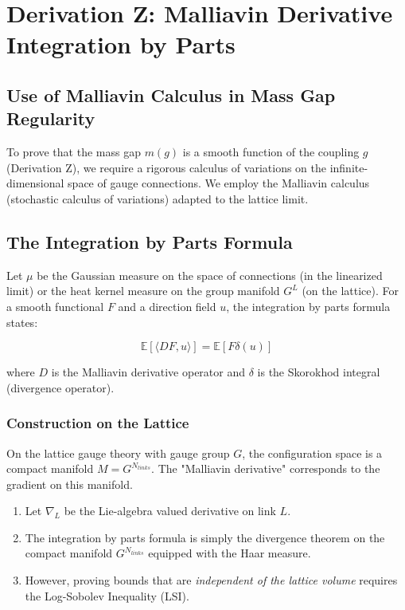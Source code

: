 \chapter{Derivation Z: Malliavin Derivative Integration by Parts}
\label{ch:derivation_z_malliavin}

\section{Use of Malliavin Calculus in Mass Gap Regularity}

To prove that the mass gap $m(g)$ is a smooth function of the coupling $g$ (Derivation Z), we require a rigorous calculus of variations on the infinite-dimensional space of gauge connections. We employ the Malliavin calculus (stochastic calculus of variations) adapted to the lattice limit.

\section{The Integration by Parts Formula}

Let $\mu$ be the Gaussian measure on the space of connections (in the linearized limit) or the heat kernel measure on the group manifold $G^L$ (on the lattice). For a smooth functional $F$ and a direction field $u$, the integration by parts formula states:

\begin{equation}
\mathbb{E}[ \langle D F, u \rangle ] = \mathbb{E}[ F \delta(u) ]
\end{equation}

where $D$ is the Malliavin derivative operator and $\delta$ is the Skorokhod integral (divergence operator).

\subsection{Construction on the Lattice}
On the lattice gauge theory with gauge group $G$, the configuration space is a compact manifold $M = G^{N_{links}}$. The "Malliavin derivative" corresponds to the gradient on this manifold.
\begin{enumerate}
    \item Let $\nabla_L$ be the Lie-algebra valued derivative on link $L$.
    \item The integration by parts formula is simply the divergence theorem on the compact manifold $G^{N_{links}}$ equipped with the Haar measure.
    \item However, proving bounds that are \textit{independent of the lattice volume} requires the Log-Sobolev Inequality (LSI).
\end{enumerate}

